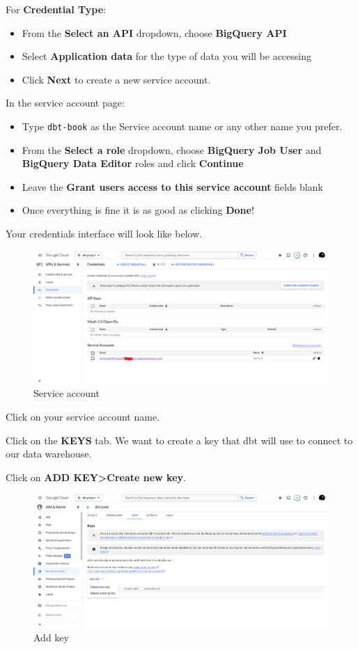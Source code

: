 \documentclass[
]{book}
\begin{document}
For \textbf{Credential Type}:

\begin{itemize}
\item
  From the \textbf{Select an API} dropdown, choose \textbf{BigQuery API}
\item
  Select \textbf{Application data} for the type of data you will be accessing
\item
  Click \textbf{Next} to create a new service account.
\end{itemize}

In the service account page:

\begin{itemize}
\item
  Type \texttt{dbt-book} as the Service account name or any other name you prefer.
\item
  From the \textbf{Select a role} dropdown, choose \textbf{BigQuery Job User} and \textbf{BigQuery Data Editor} roles and click \textbf{Continue}
\item
  Leave the \textbf{Grant users access to this service account} fields blank
\item
  Once everything is fine it is as good as clicking \textbf{Done}!
\end{itemize}

Your credentials interface will look like below.

\begin{figure}
\centering
\includegraphics{./images/service-account.png}
\caption{Service account}
\end{figure}

Click on your service account name.

Click on the \textbf{KEYS} tab. We want to create a key that dbt will use to connect to our data warehouse.

Click on \textbf{ADD KEY\textgreater Create new key}.

\begin{figure}
\centering
\includegraphics{./images/add-key.png}
\caption{Add key}
\end{figure}
\end{document}

